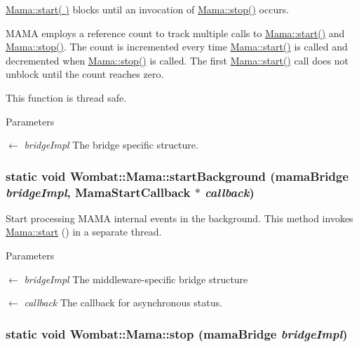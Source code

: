 \hyperlink{classWombat_1_1Mama_a826ec494ed4cd1f9b8ac1baa8ca5af30}{Mama::start( )} blocks until an invocation of \hyperlink{classWombat_1_1Mama_a88d25e14a503f35d86173bfaee50922e}{Mama::stop()} occurs.

MAMA employs a reference count to track multiple calls to \hyperlink{classWombat_1_1Mama_a826ec494ed4cd1f9b8ac1baa8ca5af30}{Mama::start()} and \hyperlink{classWombat_1_1Mama_a88d25e14a503f35d86173bfaee50922e}{Mama::stop()}. The count is incremented every time \hyperlink{classWombat_1_1Mama_a826ec494ed4cd1f9b8ac1baa8ca5af30}{Mama::start()} is called and decremented when \hyperlink{classWombat_1_1Mama_a88d25e14a503f35d86173bfaee50922e}{Mama::stop()} is called. The first \hyperlink{classWombat_1_1Mama_a826ec494ed4cd1f9b8ac1baa8ca5af30}{Mama::start()} call does not unblock until the count reaches zero.

This function is thread safe.


\begin{DoxyParams}{Parameters}
\item[\mbox{$\leftarrow$} {\em bridgeImpl}]The bridge specific structure. \end{DoxyParams}
\hypertarget{classWombat_1_1Mama_a3fe589a62f5cd705944b8ea6215b4aa3}{
\subsubsection[{startBackground}]{\setlength{\rightskip}{0pt plus 5cm}static void Wombat::Mama::startBackground (mamaBridge {\em bridgeImpl}, \/  {\bf MamaStartCallback} $\ast$ {\em callback})}}
\label{classWombat_1_1Mama_a3fe589a62f5cd705944b8ea6215b4aa3}


Start processing MAMA internal events in the background. This method invokes \hyperlink{classWombat_1_1Mama_a826ec494ed4cd1f9b8ac1baa8ca5af30}{Mama::start} () in a separate thread.


\begin{DoxyParams}{Parameters}
\item[\mbox{$\leftarrow$} {\em bridgeImpl}]The middleware-\/specific bridge structure \item[\mbox{$\leftarrow$} {\em callback}]The callback for asynchronous status. \end{DoxyParams}
\hypertarget{classWombat_1_1Mama_a88d25e14a503f35d86173bfaee50922e}{
\subsubsection[{stop}]{\setlength{\rightskip}{0pt plus 5cm}static void Wombat::Mama::stop (mamaBridge {\em bridgeImpl})}}
\label{classWombat_1_1Mama_a88d25e14a503f35d86173bfaee50922e}


